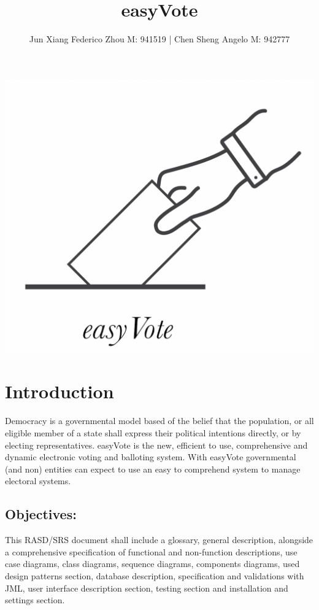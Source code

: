 \documentclass[11pt, oneside]{article}   	%
\title{easyVote}
\author{Jun Xiang Federico Zhou M: 941519 | Chen Sheng Angelo M: 942777}
\begin{document}
\maketitle

\begin{center}
\includegraphics[scale=0.4]{images/logo.png}
\end{center}

\clearpage
\tableofcontents



\clearpage


\section{Introduction}

Democracy is a governmental model based of the belief that the population, or all eligible member of a state shall express their political intentions directly, or by electing representatives. 
easyVote is the new, efficient to use, comprehensive and dynamic electronic voting and balloting system. With easyVote governmental (and non) entities can expect to use an easy to comprehend system to manage electoral systems.
\subsection{Objectives:}
This RASD/SRS document shall include a glossary, general description, alongside a comprehensive specification of functional and non-function descriptions, use case diagrams, class diagrams, sequence diagrams, components diagrams, used design patterns section, database description, specification and validations with JML, user interface description section, testing section and installation and settings section.
\end{document}
